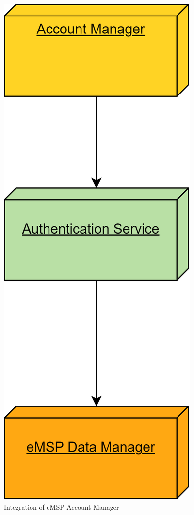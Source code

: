 \documentclass[table, 12pt]{article}
\begin{document}
\begin{figure}[H]
    \centering
    \includegraphics[scale=0.6]{assets/Integration Diagrams/eMSP-Account Manager.png} 
    \caption{Integration of eMSP-Account Manager}%
    \label{fig: eMSP-Account Manager}%
\end{figure}
\end{document}
